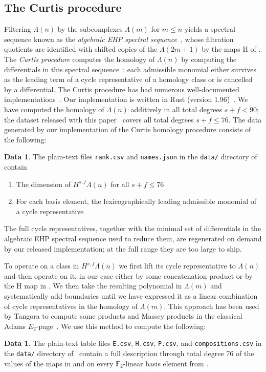 \documentclass[dvipsnames,table]{amsart}
\theoremstyle{definition}
\newtheorem{data}[theorem]{Data}
\theoremstyle{remark}
\numberwithin{equation}{section}
\begin{document}
\subsection{The Curtis procedure}
Filtering $\Lambda(n)$ by the subcomplexes $\Lambda(m)$ for $m \leq n$ yields a spectral sequence known as the \emph{algebraic EHP spectral sequence}~\cite{Ravenel_1986, Curtis_Goerss_Mahowald_Milgram_1987}, whose filtration quotients are identified with shifted copies of the $\Lambda(2m + 1)$ by the maps $\mathrm{H}$ of .
The \textit{Curtis procedure} computes the homology of $\Lambda(n)$ by computing the differentials in this spectral sequence~\cite{Whitehead_1970,Curtis_1971}: each admissible monomial either survives as the leading term of a cycle representative of a homology class or is cancelled by a differential.
The Curtis procedure has had numerous well-documented implementations~\cite{Hansen_1974,Tangora_1985,Curtis_Goerss_Mahowald_Milgram_1987,Wang_Xu_2016}. Our implementation is written in Rust (version 1.96)~\cite{ehpreprint_data}.
We have computed the homology of $\Lambda(n)$ additively in all total degrees $s + f < 90$; the dataset released with this paper~\cite{ehpreprint_data} covers all total degrees $s + f \leq 76$. The data generated by our implementation of the Curtis homology procedure consists of the following:
\begin{data}
\label{data:table}
The plain-text files \texttt{rank.csv} and \texttt{names.json} in the \texttt{data/} directory of~\cite{ehpreprint_data} contain
\begin{enumerate}
  \item The dimension of $H^{s, f}\Lambda(n)$ for all $s + f \leq 76$
  \item For each basis element, the lexicographically leading admissible monomial of a cycle representative
\end{enumerate}
The full cycle representatives, together with the minimal set of differentials in the algebraic EHP spectral sequence used to reduce them, are regenerated on demand by our released implementation; at the full range they are too large to ship.
\end{data}
\noindent To operate on a class in $H^{s, f}\Lambda(n)$ we first lift its cycle representative to $\Lambda(n)$ and then operate on it, in our case either by some concatenation product or by the $\mathrm{H}$ map in . We then take the resulting polynomial in $\Lambda(m)$ and systematically add boundaries until we have expressed it as a linear combination of cycle representatives in the homology of $\Lambda(m)$. This approach has been used by Tangora to compute some products and Massey products in the classical Adams $E_2$-page~\cite{Tangora_1993, Tangora_1994}. We use this method to compute the following:
\begin{data}
  \label{data:ehp-comp}
  The plain-text table files \texttt{E.csv}, \texttt{H.csv}, \texttt{P.csv}, and \texttt{compositions.csv} in the \texttt{data/} directory of~\cite{ehpreprint_data} contain a full description through total degree 76 of the values of the maps in  and  on every $\mathbb{F}_2$-linear basis element from .
\end{data}
\end{document}
